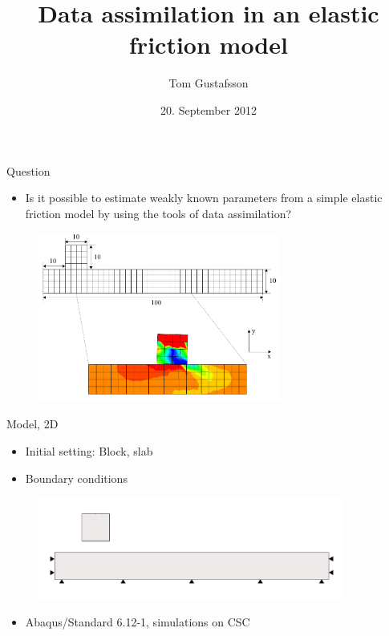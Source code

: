 \documentclass{beamer}
\title[Data assimilation in an elastic friction model]{Data assimilation in an elastic friction model}
\author{Tom Gustafsson}
\date{20. September 2012}
\begin{document}
\begin{frame}
\titlepage
\end{frame}

\begin{frame}{Question}

\begin{itemize}
\item Is it possible to estimate weakly known parameters from a simple elastic friction model by using the tools of data assimilation?
\end{itemize}

\begin{figure}
\includegraphics[width=8cm]{fretting_mesh.pdf}
\end{figure}

\end{frame}

\begin{frame}{Model, 2D}

\begin{itemize}
\item Initial setting: Block, slab
\item Boundary conditions
\end{itemize}

\begin{figure}
\includegraphics[width=10cm]{fretting_geom.pdf}
\end{figure}

\begin{itemize}
\item Abaqus/Standard 6.12-1, simulations on CSC
\end{itemize}

\end{frame}
\end{document}
